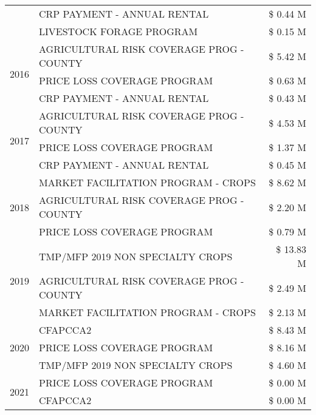 \begin{tabular}{llr}
 & CRP PAYMENT - ANNUAL RENTAL & \$ 0.44 M \\
 & LIVESTOCK FORAGE PROGRAM & \$ 0.15 M \\
\cline{1-3}
\multirow[t]{3}{*}{2016} & AGRICULTURAL RISK COVERAGE PROG - COUNTY & \$ 5.42 M \\
 & PRICE LOSS COVERAGE PROGRAM & \$ 0.63 M \\
 & CRP PAYMENT - ANNUAL RENTAL & \$ 0.43 M \\
\cline{1-3}
\multirow[t]{3}{*}{2017} & AGRICULTURAL RISK COVERAGE PROG - COUNTY & \$ 4.53 M \\
 & PRICE LOSS COVERAGE PROGRAM & \$ 1.37 M \\
 & CRP PAYMENT - ANNUAL RENTAL & \$ 0.45 M \\
\cline{1-3}
\multirow[t]{3}{*}{2018} & MARKET FACILITATION PROGRAM - CROPS & \$ 8.62 M \\
 & AGRICULTURAL RISK COVERAGE PROG - COUNTY & \$ 2.20 M \\
 & PRICE LOSS COVERAGE PROGRAM & \$ 0.79 M \\
\cline{1-3}
\multirow[t]{3}{*}{2019} & TMP/MFP 2019 NON SPECIALTY CROPS & \$ 13.83 M \\
 & AGRICULTURAL RISK COVERAGE PROG - COUNTY & \$ 2.49 M \\
 & MARKET FACILITATION PROGRAM - CROPS & \$ 2.13 M \\
\cline{1-3}
\multirow[t]{3}{*}{2020} & CFAPCCA2 & \$ 8.43 M \\
 & PRICE LOSS COVERAGE PROGRAM & \$ 8.16 M \\
 & TMP/MFP 2019 NON SPECIALTY CROPS & \$ 4.60 M \\
\cline{1-3}
\multirow[t]{2}{*}{2021} & PRICE LOSS COVERAGE PROGRAM & \$ 0.00 M \\
 & CFAPCCA2 & \$ 0.00 M \\
\cline{1-3}
\bottomrule
\end{tabular}
